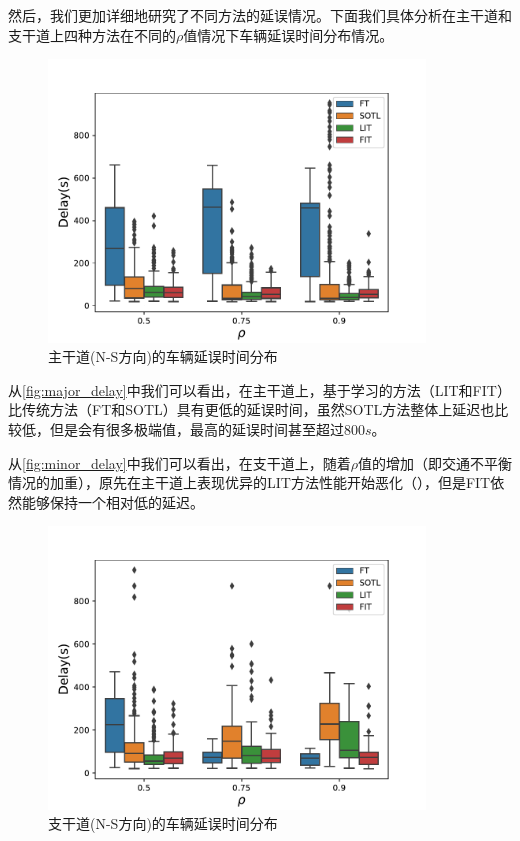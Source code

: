 然后，我们更加详细地研究了不同方法的延误情况。下面我们具体分析在主干道和支干道上四种方法在不同的$\rho$值情况下车辆延误时间分布情况。
\begin{figure}[htb]
    \includegraphics[width=10cm]{fig/major_delay.pdf}
    \caption{主干道(N-S方向)的车辆延误时间分布}
    \label{fig:major_delay}
\end{figure}
从\autoref{fig:major_delay}中我们可以看出，在主干道上，基于学习的方法（LIT和FIT）比传统方法（FT和SOTL）具有更低的延误时间，虽然SOTL方法整体上延迟也比较低，但是会有很多极端值，最高的延误时间甚至超过800$s$。

从\autoref{fig:minor_delay}中我们可以看出，在支干道上，随着$\rho$值的增加（即交通不平衡情况的加重），原先在主干道上表现优异的LIT方法性能开始恶化（），但是FIT依然能够保持一个相对低的延迟。

\begin{figure}[htb]
    \includegraphics[width=10cm]{fig/minor_delay.pdf}
    \caption{支干道(N-S方向)的车辆延误时间分布}
    \label{fig:minor_delay}
\end{figure}


